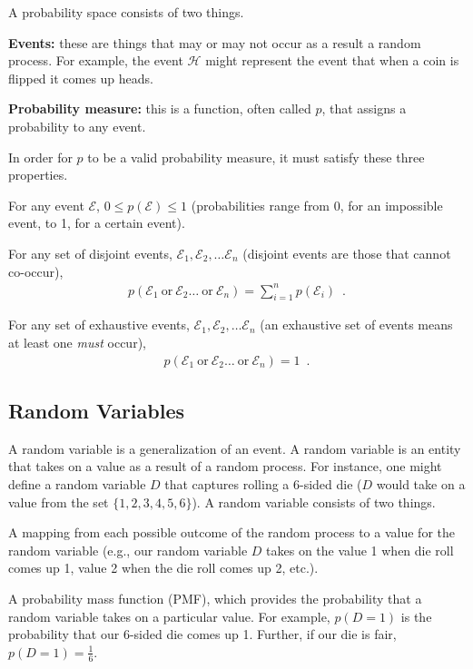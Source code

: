 \documentclass{tufte-handout}
\begin{document}
A probability space consists of two things.
\bi
\item \textbf{Events:} these are things that may or may not occur as a result a random process.  For example, the event $\mathcal{H}$ might represent the event that when a coin is flipped it comes up heads.
\item \textbf{Probability measure:} this is a function, often called $p$, that assigns a probability to any event.
\ei

In order for $p$ to be a valid probability measure, it must satisfy these three properties.
\be
\item For any event $\mathcal{E}$, $0 \leq p(\mathcal{E}) \leq 1$ (probabilities range from 0, for an impossible event, to 1, for a certain event).
\item For any set of disjoint events, $\mathcal{E}_1, \mathcal{E}_2, \ldots \mathcal{E}_n$ (disjoint events are those that cannot co-occur),
\begin{align}
p(\mathcal{E}_1~\mbox{or}~\mathcal{E}_2 \ldots ~\mbox{or}~\mathcal{E}_n) = \sum_{i=1}^n p(\mathcal{E}_i) \enspace .
\end{align}
\item For any set of exhaustive events, $\mathcal{E}_1, \mathcal{E}_2, \ldots \mathcal{E}_n$ (an exhaustive set of events means at least one \emph{must} occur),
\begin{align}
p(\mathcal{E}_1~\mbox{or}~\mathcal{E}_2 \ldots ~\mbox{or}~\mathcal{E}_n) = 1 \enspace .
\end{align}

\ee

\subsection{Random Variables}
A random variable is a generalization of an event.  A random variable is an entity that takes on a value as a result of a random process.  For instance, one might define a random variable $D$ that captures rolling a 6-sided die ($D$ would take on a value from the set $\{1, 2, 3, 4, 5, 6\}$).  A random variable consists of two things.
\bi
\item A mapping from each possible outcome of the random process to a value for the random variable (e.g., our random variable $D$ takes on the value 1 when die roll comes up 1, value 2 when the die roll comes up 2, etc.).
\item A probability mass function (PMF), which provides the probability that a random variable takes on a particular value.  For example, $p(D = 1)$ is the probability that our 6-sided die comes up 1.  Further, if our die is fair, $p(D=1)=\frac{1}{6}$.
\ei
\end{document}
